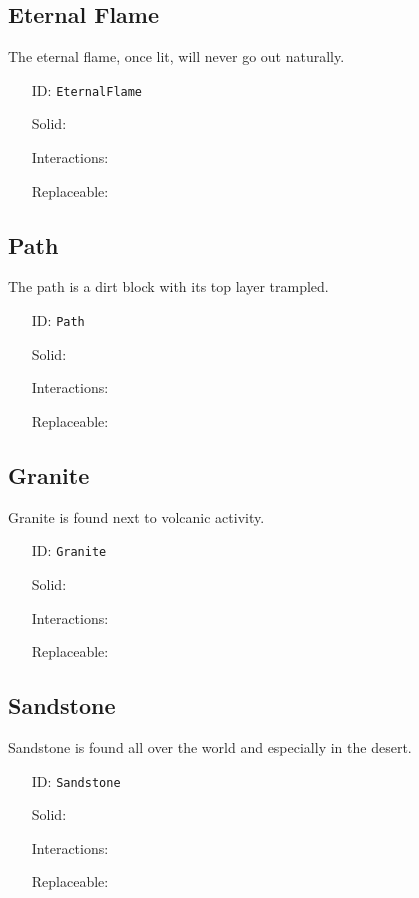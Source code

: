 \subsection{Eternal Flame}\label{subsec:blocks_eternal flame}
The eternal flame, once lit, will never go out naturally.
\newline
\begin{itemize}[nosep]
\item[ID:] \texttt{EternalFlame}
\item[Solid:]  \Checkmark \item[Interactions:]  \XSolidBrush \item[Replaceable:]  \XSolidBrush \end{itemize}

\subsection{Path}\label{subsec:blocks_path}
The path is a dirt block with its top layer trampled.
\newline
\begin{itemize}[nosep]
\item[ID:] \texttt{Path}
\item[Solid:]  \Checkmark \item[Interactions:]  \XSolidBrush \item[Replaceable:]  \XSolidBrush \end{itemize}

\subsection{Granite}\label{subsec:blocks_granite}
Granite is found next to volcanic activity.
\newline
\begin{itemize}[nosep]
\item[ID:] \texttt{Granite}
\item[Solid:]  \Checkmark \item[Interactions:]  \XSolidBrush \item[Replaceable:]  \XSolidBrush \end{itemize}

\subsection{Sandstone}\label{subsec:blocks_sandstone}
Sandstone is found all over the world and especially in the desert.
\newline
\begin{itemize}[nosep]
\item[ID:] \texttt{Sandstone}
\item[Solid:]  \Checkmark \item[Interactions:]  \XSolidBrush \item[Replaceable:]  \XSolidBrush \end{itemize}

